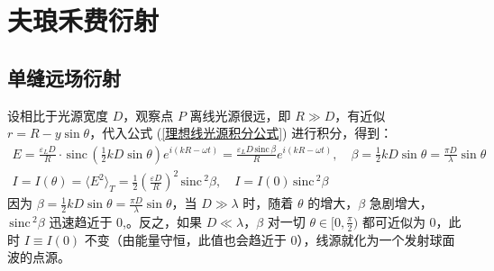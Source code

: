 \documentclass[UTF8]{report}
\def\sinc{\mathrm{\,sinc}\,}
\theoremstyle{MyLineTheoremStyle} %
\theoremstyle{MyBlockTheoremStyle} %
\theoremstyle{MySubsubsectionStyle} %
\begin{document}
\section{夫琅禾费衍射}

\subsection{单缝远场衍射}

设相比于光源宽度 $D$，观察点 $P$ 离线光源很远，即 $R \gg D$，有近似 $r = R - y\sin \theta$，代入公式 (\ref{理想线光源积分公式}) 进行积分，得到：
\begin{gather}
E = \frac{\varepsilon_L D}{R}\cdot \sinc \left(\frac{1}{2}kD \sin \theta\right) e^{i\left(kR - \omega t\right)}
= \frac{\varepsilon_L D \sinc \beta}{R}  e^{i\left(kR - \omega t\right)},\quad \beta = \frac{1}{2}kD \sin \theta = \frac{\pi D}{\lambda} \sin \theta\\ 
I = I(\theta)= \langle E^2  \rangle_T = \frac{1}{2}\left(\frac{\varepsilon D}{R}\right)^2 \sinc^2 \beta,\quad I = I(0) \sinc^2 \beta
\end{gather}
因为 $\beta = \frac{1}{2}kD \sin \theta = \frac{\pi D}{\lambda} \sin \theta $，当 $D \gg \lambda$ 时，随着 $\theta$ 的增大，$\beta$ 急剧增大，$\sinc^2 \beta$ 迅速趋近于 0,。反之，如果 $D \ll \lambda$，$\beta$ 对一切 $\theta \in [0, \frac{\pi}{2})$ 都可近似为 0，此时 $I \equiv I(0)$ 不变（由能量守恒，此值也会趋近于 0），线源就化为一个发射球面波的点源。
\end{document}
